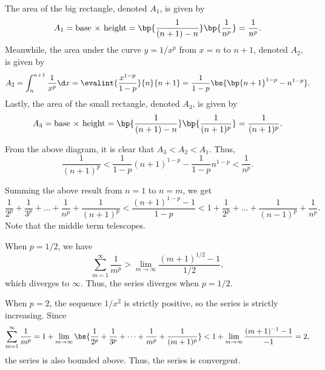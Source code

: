 \begin{solution}
    The area of the big rectangle, denoted $A_1$, is given by \[A_1 = \text{base $\times$ height} = \bp{\frac{1}{(n+1) - n}}\bp{\frac1{n^p}} = \frac{1}{n^p}.\] Meanwhile, the area under the curve $y = 1/x^p$ from $x = n$ to $n+1$, denoted $A_2$, is given by \[A_2 = \int_{n}^{n+1} \frac1{x^p} \d x = \evalint{\frac{x^{1-p}}{1 - p}}{n}{n+1} = \frac1{1-p} \bs{\bp{n+1}^{1-p} - n^{1-p}}.\] Lastly, the area of the small rectangle, denoted $A_3$, is given by \[A_3 = \text{base $\times$ height} = \bp{\frac{1}{(n+1) - n}}\bp{\frac1{(n+1)^p}} = \frac{1}{(n+1)^p}.\]

    From the above diagram, it is clear that $A_3 < A_2 < A_1$. Thus, \[\frac1{(n+1)^p} < \frac1{1-p} (n+1)^{1-p} - \frac1{1-p} n^{1-p} < \frac1{n^p}.\]

    Summing the above result from $n = 1$ to $n = m$, we get \[\frac1{2^p} + \frac1{3^p} + \dots + \frac1{n^p} + \frac1{(n+1)^p} < \frac{(n+1)^{1-p} - 1}{1-p} < 1 + \frac1{2^p} + \dots + \frac1{(n-1)^p} + \frac1{n^p}.\] Note that the middle term telescopes.

    \begin{ppart}
        When $p = 1/2$, we have \[\sum_{m = 1}^\infty \frac1{m^p} > \lim_{m \to \infty} \frac{(m+1)^{1/2} -1}{1/2},\] which diverges to $\infty$. Thus, the series diverges when $p = 1/2$.
    \end{ppart}
    \begin{ppart}
        When $p = 2$, the sequence $1/x^2$ is strictly positive, so the series is strictly increasing. Since \[\sum_{m = 1}^\infty \frac1{m^p} = 1 + \lim_{m \to \infty} \bs{\frac1{2^p} + \frac1{3^p} + \dots + \frac1{m^p} + \frac1{(m+1)^p}} < 1 + \lim_{m \to \infty} \frac{(m+1)^{-1} - 1}{-1} = 2,\] the series is also bounded above. Thus, the series is convergent.
    \end{ppart}
\end{solution}

